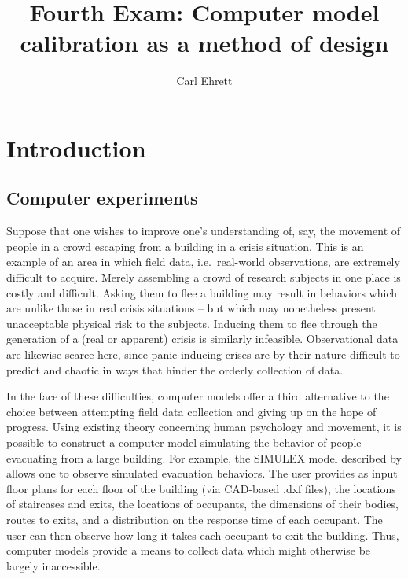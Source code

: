 \documentclass{article}
\author{Carl Ehrett}
\title{Fourth Exam: Computer model calibration as a method of design}
\begin{document}
\maketitle

\section{Introduction} \label{introduction}

\subsection{Computer experiments} \label{computer_experiments}

Suppose that one wishes to improve one's understanding of, say, the movement of people in a crowd escaping from a building in a crisis situation. This is an example of an area in which field data, i.e.\ real-world observations, are extremely difficult to acquire. Merely assembling a crowd of research subjects in one place is costly and difficult. Asking them to flee a building may result in behaviors which are unlike those in real crisis situations -- but which may nonetheless present unacceptable physical risk to the subjects. Inducing them to flee through the generation of a (real or apparent) crisis is similarly infeasible. Observational data are likewise scarce here, since panic-inducing crises are by their nature difficult to predict and chaotic in ways that hinder the orderly collection of data.

In the face of these difficulties, computer models offer a third alternative to the choice between attempting field data collection and giving up on the hope of progress. Using existing theory concerning human psychology and movement, it is possible to construct a computer model simulating the behavior of people evacuating from a large building. For example, the SIMULEX model described by \cite{Thompson1995} allows one to observe simulated evacuation behaviors.
The user provides as input floor plans for each floor of the building (via CAD-based .dxf files), the locations of staircases and exits, the locations of occupants, the dimensions of their bodies, routes to exits, and a distribution on the response time of each occupant. 
The user can then observe how long it takes each occupant to exit the building.
Thus, computer models provide a means to collect data which might otherwise be largely inaccessible. 
\end{document}
